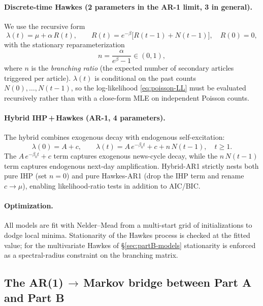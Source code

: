 \documentclass[11pt]{article}
\begin{document}
\paragraph{Discrete-time Hawkes (2 parameters in the AR-1 limit, 3 in general).}
We use the recursive form
\begin{equation}
  \lambda(t)=\mu+\alpha\,R(t),\qquad R(t)=e^{-\beta}\bigl[R(t-1)+N(t-1)\bigr],
  \quad R(0)=0,
  \label{eq:hawkes}
\end{equation}
with the stationary reparameterization
\begin{equation}
  n=\frac{\alpha}{e^{\beta}-1}\in(0,1),
\end{equation}
where $n$ is the \emph{branching ratio} (the expected number of secondary
articles triggered per article). $\lambda(t)$ is conditional on the past
counts $N(0),\dots,N(t-1)$, so the log-likelihood
\eqref{eq:poisson-LL} must be evaluated recursively rather than with a
close-form MLE on independent Poisson counts.

\paragraph{Hybrid IHP\,+\,Hawkes (AR-1, 4 parameters).}
The hybrid combines exogenous decay with endogenous self-excitation:
\begin{equation}
  \lambda(0)=A+c,\qquad
  \lambda(t)=A\,e^{-\beta_0 t}+c+n\,N(t-1),\quad t\ge 1.
\end{equation}
The $A\,e^{-\beta_0 t}+c$ term captures exogenous news-cycle decay, while the
$n\,N(t-1)$ term captures endogenous next-day amplification. Hybrid-AR1
strictly nests both pure IHP (set $n=0$) and pure Hawkes-AR1 (drop the IHP
term and rename $c\!\to\!\mu$), enabling likelihood-ratio tests in addition to
AIC/BIC.

\paragraph{Optimization.} All models are fit with Nelder--Mead from a
multi-start grid of initializations to dodge local minima. Stationarity of
the Hawkes process is checked at the fitted value; for the multivariate
Hawkes of \S\ref{sec:partB-models} stationarity is enforced as a
spectral-radius constraint on the branching matrix.

\subsection{The AR(1)\,$\to$\,Markov bridge between Part A and Part B}
\label{sec:bridge}
\end{document}

